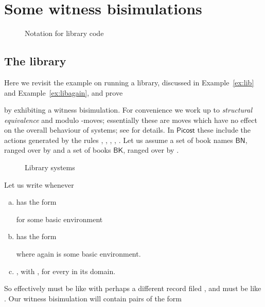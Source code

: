 \documentclass{LMCS}
\newcommand{\pfn}[1]{\mathsf{#1}}  \newcommand{\cfn}[1]{\mathsf{#1}}  \newcommand{\ownfnt}[1]{{\mathsf{#1}}}
\newcommand{\picost}{\ensuremath{\pfn{Picost}}\xspace}
\begin{document}
\appendix


\section{Some witness bisimulations}


\begin{figure}[t]
  


  \caption{Notation for library code}
  \label{fig:libcode}

\end{figure}

\subsection{The library}\label{app:library}

\newcommand{\BookN}{\ensuremath{\mathsf{BN}}\xspace}
\newcommand{\Books}{\ensuremath{\mathsf{BK}}\xspace}
\newcommand{\Deltadyn}{\Delta_{\scriptstyle dyn}}

Here we revisit the example on running a library, discussed in Example~\ref{ex:lib} and 
Example~\ref{ex:libagain}, and prove

by exhibiting a witness bisimulation.  For convenience we work up to
\emph{structural equivalence} and modulo -moves; essentially
these are moves which have no effect on the overall behaviour of
systems; see \cite{dpibook,groote} for details.  In \picost these include the actions  generated by the rules 
, , , , .
Let us assume a set of book names \BookN, ranged over by  and a
set of books \Books, ranged over by . 

\begin{figure}[t]
  
  \caption{Library systems}
  \label{fig:libconfs}
\end{figure}


Let us write  whenever
\begin{enumerate}[(a)]
\item  has the form 
  
for some basic environment   



\item  has the form 
  
where again  is 
some basic environment. 

\item , with , for
every  in its domain. 
\end{enumerate}
So effectively  must be like  with perhaps a different 
record filed , and  must be like . 
Our witness bisimulation will contain pairs of
the form 
\end{document}

